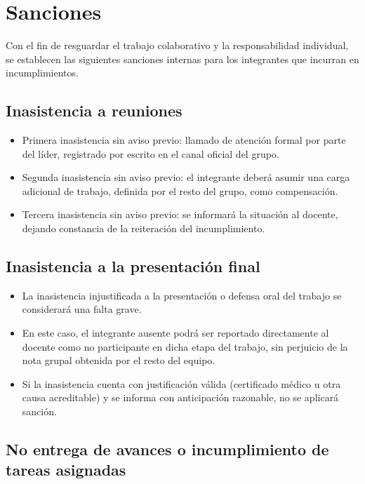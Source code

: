\section{Sanciones}
\label{sec:sanciones}

Con el fin de resguardar el trabajo colaborativo y la responsabilidad individual, se establecen las siguientes sanciones internas para los integrantes que incurran en incumplimientos.

\subsection{Inasistencia a reuniones}

\begin{itemize}[label=--]
    \item Primera inasistencia sin aviso previo: llamado de atención formal por parte del líder, registrado por escrito en el canal oficial del grupo.
    \item Segunda inasistencia sin aviso previo: el integrante deberá asumir una carga adicional de trabajo, definida por el resto del grupo, como compensación.
    \item Tercera inasistencia sin aviso previo: se informará la situación al docente, dejando constancia de la reiteración del incumplimiento.
\end{itemize}

\subsection{Inasistencia a la presentación final}

\begin{itemize}[label=--]
    \item La inasistencia injustificada a la presentación o defensa oral del trabajo se considerará una falta grave.
    \item En este caso, el integrante ausente podrá ser reportado directamente al docente como no participante en dicha etapa del trabajo, sin perjuicio de la nota grupal obtenida por el resto del equipo.
    \item Si la inasistencia cuenta con justificación válida (certificado médico u otra causa acreditable) y se informa con anticipación razonable, no se aplicará sanción.
\end{itemize}

\subsection{No entrega de avances o incumplimiento de tareas asignadas}

